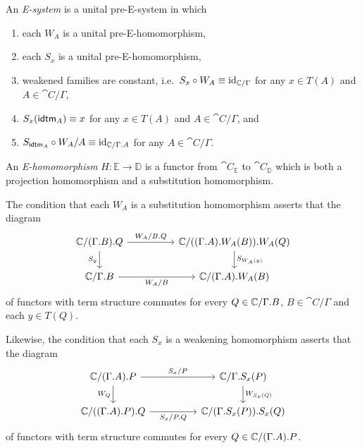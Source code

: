 \begin{defn}
\label{defn:esystems}
An \emph{E-system} is a unital pre-E-system in which 
\begin{enumerate}
\item each $W_A$ is a unital pre-E-homomorphism,
\item each $S_x$ is a unital pre-E-homomorphism,
\item \label{tTf:StWf_id} weakened families are constant, i.e.~$S_x\circ W_A\equiv {\mathrm{id}_{\mathbb{C}/\Gamma}}$ for any $x\in T(A)$ and $A\in\cat{C}/\Gamma$,
\item $S_x(\tfid{A})\jdeq x$ for any $x\in T(A)$ and $A\in\cat{C}/\Gamma$, and
\item \label{f:SidfWff_id} $S_{\tfid{A}}\circ W_A/A\jdeq \catid{\cat{C}/\ctxext{\Gamma}{A}}$ for any $A\in\cat{C}/\Gamma$.
\end{enumerate}
An \emph{E-homomorphism} $H:\mathbb{E}\to\mathbb{D}$ is a functor from
$\cat{C}_{\mathbb{E}}$ to $\cat{C}_{\mathbb{D}}$ which is both a projection
homomorphism and a substitution homomorphism.
\end{defn}

\begin{rmk}
The condition that each $W_A$ is a substitution homomorphism asserts that
the diagram
\begin{equation*}
\begin{tikzcd}[column sep=huge]
\cat{C}/\ctxext{{\Gamma}{B}}{Q}
  \arrow[r,"W_A/\ctxext{B}{Q}"]
  \arrow[d,swap,"S_y"]
  &
\cat{C}/\ctxext{{{\Gamma}{A}}{W_A(B)}}{W_A(Q)}
  \arrow[d,"S_{W_A(y)}"]
  \\
\cat{C}/\ctxext{\Gamma}{B}
  \arrow[r,swap,"W_A/B"]
  &
\cat{C}/\ctxext{{\Gamma}{A}}{W_A(B)}
\end{tikzcd}
\end{equation*}
of functors with term structure commutes for every 
$Q\in\cat{C}/\ctxext{\Gamma}{B}$, $B\in\cat{C}/\Gamma$ and each $y\in T(Q)$.

Likewise, the condition that each $S_x$ is a weakening homomorphism
asserts that the diagram
\begin{equation*}
\begin{tikzcd}[column sep=huge]
\cat{C}/\ctxext{{\Gamma}{A}}{P}
  \arrow[r,"S_x/P"]
  \arrow[d,swap,"W_Q"]
  &
\cat{C}/\ctxext{\Gamma}{S_x(P)}
  \arrow[d,"W_{S_x(Q)}"]
  \\
\cat{C}/\ctxext{{{\Gamma}{A}}{P}}{Q}
  \arrow[r,swap,"S_x/\ctxext{P}{Q}"]
  &
\cat{C}/\ctxext{{\Gamma}{S_x(P)}}{S_x(Q)}
\end{tikzcd}
\end{equation*}
of functors with term structure commutes for every 
$Q\in\cat{C}/\ctxext{{\Gamma}{A}}{P}$.
\end{rmk}

